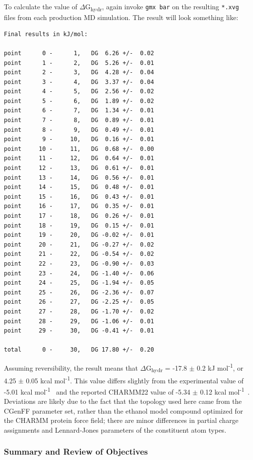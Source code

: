 \documentclass[9pt,tutorial,pubversion]{livecoms}
\begin{document}
To calculate the value of $\Delta$G\textsubscript{hydr}, again invoke \texttt{gmx bar} on the resulting \texttt{*.xvg} files from each production MD simulation. The result will look something like:

\begin{lstlisting}
Final results in kJ/mol:

point      0 -      1,   DG  6.26 +/-  0.02
point      1 -      2,   DG  5.26 +/-  0.01
point      2 -      3,   DG  4.28 +/-  0.04
point      3 -      4,   DG  3.37 +/-  0.04
point      4 -      5,   DG  2.56 +/-  0.02
point      5 -      6,   DG  1.89 +/-  0.02
point      6 -      7,   DG  1.34 +/-  0.01
point      7 -      8,   DG  0.89 +/-  0.01
point      8 -      9,   DG  0.49 +/-  0.01
point      9 -     10,   DG  0.16 +/-  0.01
point     10 -     11,   DG  0.68 +/-  0.00
point     11 -     12,   DG  0.64 +/-  0.01
point     12 -     13,   DG  0.61 +/-  0.01
point     13 -     14,   DG  0.56 +/-  0.01
point     14 -     15,   DG  0.48 +/-  0.01
point     15 -     16,   DG  0.43 +/-  0.01
point     16 -     17,   DG  0.35 +/-  0.01
point     17 -     18,   DG  0.26 +/-  0.01
point     18 -     19,   DG  0.15 +/-  0.01
point     19 -     20,   DG -0.02 +/-  0.01
point     20 -     21,   DG -0.27 +/-  0.02
point     21 -     22,   DG -0.54 +/-  0.02
point     22 -     23,   DG -0.90 +/-  0.03
point     23 -     24,   DG -1.40 +/-  0.06
point     24 -     25,   DG -1.94 +/-  0.05
point     25 -     26,   DG -2.36 +/-  0.07
point     26 -     27,   DG -2.25 +/-  0.05
point     27 -     28,   DG -1.70 +/-  0.02
point     28 -     29,   DG -1.06 +/-  0.01
point     29 -     30,   DG -0.41 +/-  0.01

total      0 -     30,   DG 17.80 +/-  0.20
\end{lstlisting}

Assuming reversibility, the result means that $\Delta$G\textsubscript{hydr} = -17.8 $\pm$ 0.2 kJ mol\textsuperscript{-1}, or 4.25 $\pm$ 0.05 kcal mol\textsuperscript{-1}. This value differs slightly from the experimental value of -5.01 kcal mol\textsuperscript{-1}~\cite{Kelly2005} and the reported CHARMM22 value of -5.34 $\pm$ 0.12 kcal mol\textsuperscript{-1}~\cite{Anisimov2007}. Deviations are likely due to the fact that the topology used here came from the CGenFF parameter set, rather than the ethanol model compound optimized for the CHARMM protein force field; there are minor differences in partial charge assignments and Lennard-Jones parameters of the constituent atom types.

\subsubsection{Summary and Review of Objectives} \label{dgsolv_summary}
\end{document}
